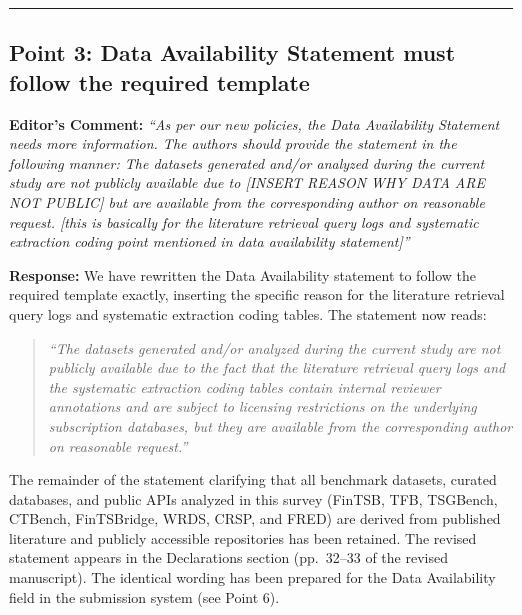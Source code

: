 \documentclass[11pt,a4paper]{article}
\begin{document}
\vspace{1.5em}
\hrule
\vspace{1.5em}

\subsection*{Point 3: Data Availability Statement must follow the required template}

\vspace{0.5em}
\noindent\textbf{Editor's Comment:}
\textit{``As per our new policies, the Data Availability Statement needs more information. The authors should provide the statement in the following manner: The datasets generated and/or analyzed during the current study are not publicly available due to [INSERT REASON WHY DATA ARE NOT PUBLIC] but are available from the corresponding author on reasonable request. [this is basically for the literature retrieval query logs and systematic extraction coding point mentioned in data availability statement]''}

\vspace{0.5em}
\noindent\textbf{Response:}
We have rewritten the Data Availability statement to follow the required template exactly, inserting the specific reason for the literature retrieval query logs and systematic extraction coding tables. The statement now reads:

\vspace{0.5em}
\noindent\begin{quote}
\itshape ``The datasets generated and/or analyzed during the current study are not publicly available due to the fact that the literature retrieval query logs and the systematic extraction coding tables contain internal reviewer annotations and are subject to licensing restrictions on the underlying subscription databases, but they are available from the corresponding author on reasonable request.''
\end{quote}

\vspace{0.5em}
\noindent The remainder of the statement clarifying that all benchmark datasets, curated databases, and public APIs analyzed in this survey (FinTSB, TFB, TSGBench, CTBench, FinTSBridge, WRDS, CRSP, and FRED) are derived from published literature and publicly accessible repositories has been retained. The revised statement appears in the Declarations section (pp.~32--33 of the revised manuscript). The identical wording has been prepared for the Data Availability field in the submission system (see Point 6).
\end{document}
